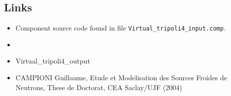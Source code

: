 \subsection*{Links}
\begin{itemize}
  \item Component source code found in file \texttt{Virtual\_tripoli4\_input.comp}.
  \item {}
  \item Virtual\_tripoli4\_output
  \item CAMPIONI Guillaume, Etude et Modelisation des Sources Froides de Neutrons, These de Doctorat, CEA Saclay/UJF (2004)
\end{itemize}
